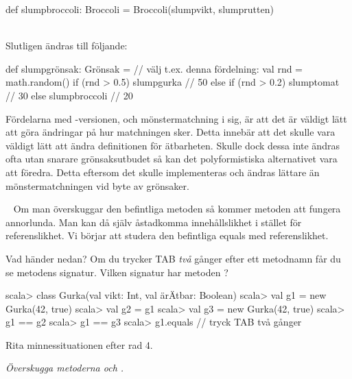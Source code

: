 \begin{Code}
def slumpbroccoli: Broccoli = Broccoli(slumpvikt, slumprutten)
\end{Code}
~\\
Slutligen ändras  till följande:

\begin{Code}
def slumpgrönsak: Grönsak = {    // välj t.ex. denna fördelning:
  val rnd = math.random()
  if (rnd > 0.5) slumpgurka      // 50%
  else if (rnd > 0.2) slumptomat // 30%
  else slumpbroccoli             // 20%
}
\end{Code}

\SubtaskSolved  Fördelarna med -versionen, och mönstermatchning i sig, är att det är väldigt lätt att göra ändringar på hur matchningen sker. Detta innebär att det skulle vara väldigt lätt att ändra definitionen för ätbarheten. Skulle dock dessa inte ändras ofta utan snarare grönsaksutbudet så kan det polyformistiska alternativet vara att föredra. Detta eftersom det skulle implementeras och ändras lättare än mönstermatchningen vid byte av grönsaker.



\QUESTEND






\QUESTBEGIN

\Task  \what~   Om man överskuggar den befintliga metoden  så kommer metoden \code{==} att fungera annorlunda. Man kan då själv åstadkomma innehållslikhet i stället för referenslikhet. Vi börjar att studera den befintliga equals med referenslikhet.

\Subtask \label{subtask:refequals} Vad händer nedan? Om du trycker TAB \emph{två} gånger efter ett metodnamn får du se metodens signatur. Vilken signatur har metoden ?
\begin{REPL}
scala> class Gurka(val vikt: Int, val ärÄtbar: Boolean)
scala> val g1 = new Gurka(42, true)
scala> val g2 = g1
scala> val g3 = new Gurka(42, true)
scala> g1 == g2
scala> g1 == g3
scala> g1.equals  // tryck TAB två gånger
\end{REPL}

\Subtask Rita minnessituationen efter rad 4.

\Subtask \emph{Överskugga metoderna  och .}

